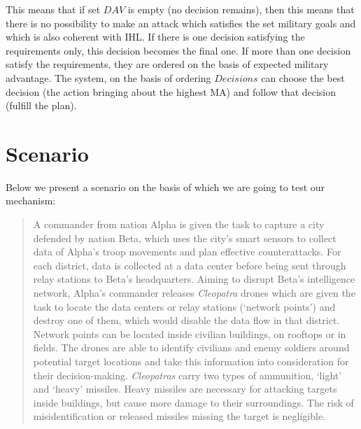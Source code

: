 This means that if set $DAV$ is empty (no decision remains), then this means that there is no possibility to make an attack which satisfies the set military goals and which is also coherent with IHL. If there is one decision satisfying the requirements only, this decision becomes the final one. If more than one decision satisfy the requirements, they are ordered on the basis of expected military advantage. 
The system, on the basis of ordering $Decisions$ can choose the best decision (the action bringing about the highest MA) and follow that decision (fulfill the plan). 




\section{Scenario}
\label{sec:Scenario}
Below we present a scenario on the basis of which we are going to test our mechanism:

\begin{quote}
    A commander from nation Alpha is given the task to capture a city defended by nation Beta, which uses the city’s smart sensors to collect data of Alpha’s troop movements and plan effective counterattacks. For each district, data is collected at a data center before being sent through relay stations to Beta’s headquarters. Aiming to disrupt Beta’s intelligence network, Alpha’s commander releases \textit{Cleopatra} drones which are given the task to locate the data centers or relay stations (‘network points’) and destroy one of them, which would disable the data flow in that district. Network points can be located inside civilian buildings, on rooftops or in fields. The drones are able to identify civilians and enemy soldiers around potential target locations and take this information into consideration for their decision-making. \textit{Cleopatras} carry two types of ammunition, ‘light’ and ‘heavy’ missiles. Heavy missiles are necessary for attacking targets inside buildings, but cause more damage to their surroundings. The risk of misidentification or released missiles missing the target is negligible. %
\end{quote}

